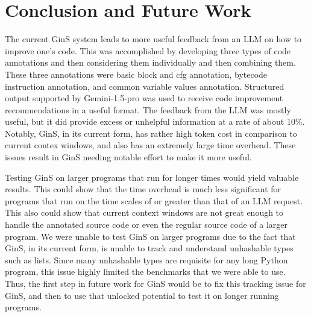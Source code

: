 \documentclass[sigconf,nonacm]{acmart}
\begin{document}
\section{Conclusion and Future Work}
The current GinS system leads to more useful feedback from an LLM on how to improve one's code.
This was accomplished by developing three types of code annotations and then considering them individually and then combining them.
These three annotations were basic block and cfg annotation, bytecode instruction annotation, and common variable values annotation.
Structured output supported by Gemini-1.5-pro was used to receive code improvement recommendations in a useful format.
The feedback from the LLM was mostly useful, but it did provide excess or unhelpful information at a rate of about 10\%.
Notably, GinS, in its current form, has rather high token cost in comparison to current contex windows, and also has an extremely large time overhead.
These issues result in GinS needing notable effort to make it more useful.

Testing GinS on larger programs that run for longer times would yield valuable results.
This could show that the time overhead is much less significant for programs that run on the time scales of or greater than that of an LLM request.
This also could show that current context windows are not great enough to handle the annotated source code or even the regular source code of a larger program.
We were unable to test GinS on larger programs due to the fact that GinS, in its current form, is unable to track and understand unhashable types such as lists.
Since many unhashable types are requisite for any long Python program, this issue highly limited the benchmarks that we were able to use.
Thus, the first step in future work for GinS would be to fix this tracking issue for GinS, and then to use that unlocked potential to test it on longer running programs.




\end{document}
